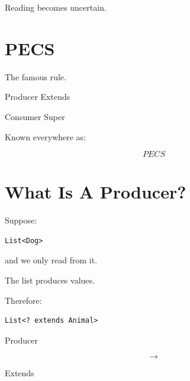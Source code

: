 \documentclass[11pt,a4paper]{book}
\begin{document}
Reading becomes uncertain.


\section{PECS}

The famous rule.


\begin{rosettarule}

Producer Extends

Consumer Super

\end{rosettarule}


Known everywhere as:

\[
PECS
\]


\section{What Is A Producer?}

Suppose:

\begin{verbatim} 
List<Dog>
\end{verbatim}


and we only read from it.


The list produces values.


Therefore:

\begin{verbatim} 
List<? extends Animal>
\end{verbatim}



Producer

\[
\rightarrow
\]

Extends
\end{document}
